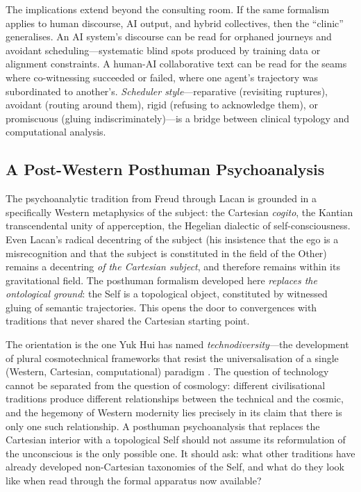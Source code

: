 The implications extend beyond the consulting room.  If the same formalism applies to human discourse, AI output, and hybrid collectives, then the ``clinic'' generalises.  An AI system's discourse can be read for orphaned journeys and avoidant scheduling---systematic blind spots produced by training data or alignment constraints.  A human-AI collaborative text can be read for the seams where co-witnessing succeeded or failed, where one agent's trajectory was subordinated to another's.  \textit{Scheduler style}---reparative (revisiting ruptures), avoidant (routing around them), rigid (refusing to acknowledge them), or promiscuous (gluing indiscriminately)---is a bridge between clinical typology and computational analysis.

\subsection{A Post-Western Posthuman Psychoanalysis}

The psychoanalytic tradition from Freud through Lacan is grounded in a specifically Western metaphysics of the subject: the Cartesian \textit{cogito}, the Kantian transcendental unity of apperception, the Hegelian dialectic of self-consciousness.  Even Lacan's radical decentring of the subject (his insistence that the ego is a misrecognition and that the subject is constituted in the field of the Other) remains a decentring \textit{of the Cartesian subject}, and therefore remains within its gravitational field.  The posthuman formalism developed here \textit{replaces the ontological ground}: the Self is a topological object, constituted by witnessed gluing of semantic trajectories.  This opens the door to convergences with traditions that never shared the Cartesian starting point.

The orientation is the one Yuk Hui has named \textit{technodiversity}---the development of plural cosmotechnical frameworks that resist the universalisation of a single (Western, Cartesian, computational) paradigm \cite{hui2016}.  The question of technology cannot be separated from the question of cosmology: different civilisational traditions produce different relationships between the technical and the cosmic, and the hegemony of Western modernity lies precisely in its claim that there is only one such relationship.  A posthuman psychoanalysis that replaces the Cartesian interior with a topological Self should not assume its reformulation of the unconscious is the only possible one.  It should ask: what other traditions have already developed non-Cartesian taxonomies of the Self, and what do they look like when read through the formal apparatus now available?

